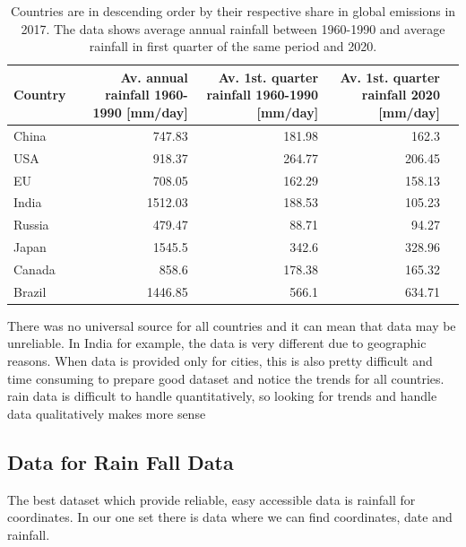 \begin{table}[htb]
	\begin{center}
		\begin{tabular}{lrrrr}
			Country & Av. annual rainfall 1960-1990 [mm/day] & Av. 1st. quarter rainfall 1960-1990 [mm/day] & Av. 1st. quarter rainfall 2020 [mm/day] \\\midrule
			China & 747.83 & 181.98 & 162.3 \\
			USA & 918.37 & 264.77 & 206.45 \\
			EU & 708.05 & 162.29 & 158.13 \\
			India & 1512.03 & 188.53 & 105.23\\
			Russia & 479.47 & 88.71 & 94.27 \\
			Japan & 1545.5 & 342.6 & 328.96 \\
			Canada & 858.6 & 178.38 & 165.32 \\
			Brazil & 1446.85 & 566.1 & 634.71 \\
		\end{tabular}
		\caption{Countries are in descending order by their respective share in global  emissions in 2017. The data shows average annual rainfall between 1960-1990 and average rainfall in first quarter of the same period and 2020.}
		\label{tab:data_weather}
	\end{center}
	
\end{table}

There was no universal source for all countries and it can mean that data may be unreliable. In India for example, the data is very different due to geographic reasons. When data is provided only for cities, this is also pretty difficult and time consuming to prepare good dataset and notice the trends for all countries. rain data is difficult to handle quantitatively, so looking for trends and handle data qualitatively makes more sense

\subsection{Data for Rain Fall Data}

The best dataset which provide reliable, easy accessible data is rainfall for coordinates. In our one set there is data where we can find coordinates, date and rainfall. 

